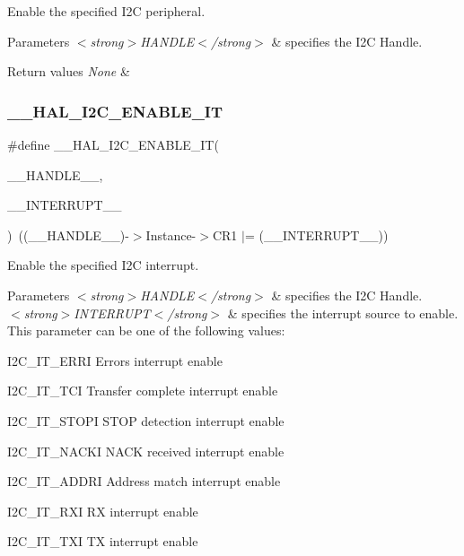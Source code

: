 Enable the specified I2C peripheral. 


\begin{DoxyParams}{Parameters}
{\em $<$strong$>$\+H\+A\+N\+D\+L\+E$<$/strong$>$} & specifies the I2C Handle. \\
\hline
\end{DoxyParams}

\begin{DoxyRetVals}{Return values}
{\em None} & \\
\hline
\end{DoxyRetVals}
\mbox{\label{group___i2_c___exported___macros_gac9d8b249b06b2d30f987acc9ceebd1d9}} 
\subsubsection{\texorpdfstring{\_\_HAL\_I2C\_ENABLE\_IT}{\_\_HAL\_I2C\_ENABLE\_IT}}
{\footnotesize\ttfamily \#define \+\_\+\+\_\+\+H\+A\+L\+\_\+\+I2\+C\+\_\+\+E\+N\+A\+B\+L\+E\+\_\+\+IT(\begin{DoxyParamCaption}\item[{}]{\+\_\+\+\_\+\+H\+A\+N\+D\+L\+E\+\_\+\+\_\+,  }\item[{}]{\+\_\+\+\_\+\+I\+N\+T\+E\+R\+R\+U\+P\+T\+\_\+\+\_\+ }\end{DoxyParamCaption})~((\+\_\+\+\_\+\+H\+A\+N\+D\+L\+E\+\_\+\+\_\+)-\/$>$Instance-\/$>$C\+R1 $\vert$= (\+\_\+\+\_\+\+I\+N\+T\+E\+R\+R\+U\+P\+T\+\_\+\+\_\+))}



Enable the specified I2C interrupt. 


\begin{DoxyParams}{Parameters}
{\em $<$strong$>$\+H\+A\+N\+D\+L\+E$<$/strong$>$} & specifies the I2C Handle. \\
\hline
{\em $<$strong$>$\+I\+N\+T\+E\+R\+R\+U\+P\+T$<$/strong$>$} & specifies the interrupt source to enable. This parameter can be one of the following values\+: \begin{DoxyItemize}
\item I2\+C\+\_\+\+I\+T\+\_\+\+E\+R\+RI Errors interrupt enable \item I2\+C\+\_\+\+I\+T\+\_\+\+T\+CI Transfer complete interrupt enable \item I2\+C\+\_\+\+I\+T\+\_\+\+S\+T\+O\+PI S\+T\+OP detection interrupt enable \item I2\+C\+\_\+\+I\+T\+\_\+\+N\+A\+C\+KI N\+A\+CK received interrupt enable \item I2\+C\+\_\+\+I\+T\+\_\+\+A\+D\+D\+RI Address match interrupt enable \item I2\+C\+\_\+\+I\+T\+\_\+\+R\+XI RX interrupt enable \item I2\+C\+\_\+\+I\+T\+\_\+\+T\+XI TX interrupt enable\end{DoxyItemize}
\\
\hline
\end{DoxyParams}

